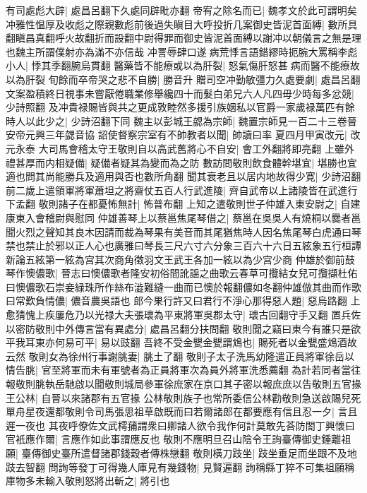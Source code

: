 有司處彪大辟|{
	處昌呂翻下久處同辟毗亦翻}
帝宥之除名而已|{
	魏孝文於此可謂明矣}
冲雅性愠厚及收彪之際親數彪前後過失瞋目大呼投折几案御史皆泥首面縛|{
	數所具翻瞋昌真翻呼火故翻折而設翻中尉得罪而御史皆泥首面縛以謝冲以朝儀言之無是理也魏主所謂僕射亦為滿不亦信哉}
冲詈辱肆口遂病荒悸言語錯繆時扼腕大罵稱李彪小人|{
	悸其季翻腕烏貫翻}
醫藥皆不能療或以為肝裂|{
	怒氣傷肝怒甚病而醫不能療故以為肝裂}
旬餘而卒帝哭之悲不自勝|{
	勝音升}
贈司空冲勤敏彊力久處要劇|{
	處昌呂翻}
文案盈積終日視事未嘗厭倦職業修舉纔四十而髮白弟兄六人凡四毋少時每多忿競|{
	少詩照翻}
及冲貴禄賜皆與共之更成敦睦然多援引族姻私以官爵一家歲禄萬匹有餘時人以此少之|{
	少詩沼翻下同}
魏主以彭城王勰為宗師|{
	魏置宗師見一百二十三卷晉安帝元興三年勰音協}
詔使督察宗室有不帥教者以聞|{
	帥讀曰率}
夏四月甲寅改元|{
	改元永泰}
大司馬會稽太守王敬則自以高武舊將心不自安|{
	會工外翻將即亮翻}
上雖外禮甚厚而内相疑備|{
	疑備者疑其為變而為之防}
數訪問敬則飲食體幹堪宜|{
	堪勝也宜適也問其尚能勝兵及適用與否也數所角翻}
聞其衰老且以居内地故得少寛|{
	少詩沼翻}
前二歲上遣領軍將軍蕭坦之將齋仗五百人行武進陵|{
	齊自武帝以上諸陵皆在武進行下孟翻}
敬則諸子在都憂怖無計|{
	怖普布翻}
上知之遣敬則世子仲雄入東安尉之|{
	自建康東入會稽尉與慰同}
仲雄善琴上以蔡邕焦尾琴借之|{
	蔡邕在吳吳人有燒桐以爨者邕聞火烈之聲知其良木因請而裁為琴果有美音而其尾猶焦時人因名焦尾琴白虎通曰琴禁也禁止於邪以正人心也廣雅曰琴長三尺六寸六分象三百六十六日五絃象五行桓譚新論五絃第一絃為宫其次商角徵羽文王武王各加一絃以為少宫少商}
仲雄於御前鼓琴作懊儂歌|{
	晉志曰懊儂歌者隆安初俗間訛謡之曲歌云春草可攬結女兒可攬擷杜佑曰懊儂歌石崇妾緑珠所作絲布澁難縫一曲而已懊於報翻儂如冬翻仲雄倣其曲而作歌}
曰常歎負情儂|{
	儂音農吳語也}
郎今果行許又曰君行不淨心那得惡人題|{
	惡烏路翻}
上愈猜愧上疾屢危乃以光禄大夫張瓌為平東將軍吳郡太守|{
	瓌古回翻守手又翻}
置兵佐以密防敬則中外傳言當有異處分|{
	處昌呂翻分扶問翻}
敬則聞之竊曰東今有誰只是欲平我耳東亦何易可平|{
	易以豉翻}
吾終不受金甖金甖謂鴆也|{
	賜死者以金甖盛鴆酒故云然}
敬則女為徐州行事謝朓妻|{
	朓土了翻}
敬則子太子洗馬幼隆遣正員將軍徐岳以情告脁|{
	官至將軍而未有軍號者為正員將軍次為員外將軍洗悉薦翻}
為計若同者當往報敬則朓執岳馳啟以聞敬則城局參軍徐庶家在京口其子密以報庶庶以告敬則五官掾王公林|{
	自晉以來諸郡有五官掾}
公林敬則族子也常所委信公林勸敬則急送啟賜兒死單舟星夜還都敬則令司馬張思祖草啟既而曰若爾諸郎在都要應有信且忍一夕|{
	言且遲一夜也}
其夜呼僚佐文武樗蒱謂衆曰卿諸人欲令我作何計莫敢先荅防閤丁興懷曰官衹應作爾|{
	言應作如此事謂應反也}
敬則不應明旦召山陰令王詢臺傳御史鍾離祖願|{
	臺傳御史臺所遣督諸郡錢穀者傳株戀翻}
敬則橫刀跂坐|{
	跂坐垂足而坐跟不及地跂去智翻}
問詢等發丁可得幾人庫見有幾錢物|{
	見賢遍翻}
詢稱縣丁猝不可集祖願稱庫物多未輸入敬則怒將出斬之|{
	將引也}
